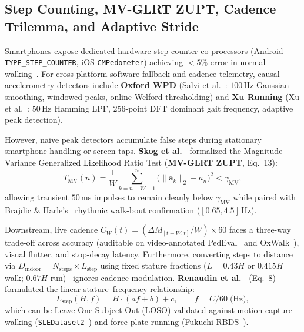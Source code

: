 \subsection{Step Counting, MV-GLRT ZUPT, Cadence Trilemma, and Adaptive Stride}
Smartphones expose dedicated hardware step-counter co-processors (Android \texttt{TYPE\_STEP\_COUNTER}, iOS \texttt{CMPedometer}) achieving $<5\%$ error in normal walking~\cite{brajdic2013walk}. For cross-platform software fallback and cadence telemetry, causal accelerometry detectors include \textbf{Oxford WPD} (Salvi et al.~\cite{salvi2018oxford}: $100$\,Hz Gaussian smoothing, windowed peaks, online Welford thresholding) and \textbf{Xu Running} (Xu et al.~\cite{xu2022step}: $50$\,Hz Hamming LPF, 256-point DFT dominant gait frequency, adaptive peak detection).

However, naive peak detectors accumulate false steps during stationary smartphone handling or screen taps. \textbf{Skog et al.~\cite{skog2010zupt}} formalized the Magnitude-Variance Generalized Likelihood Ratio Test (\textbf{MV-GLRT ZUPT}, Eq.~13):
\begin{equation}
    T_{\text{MV}}(n) = \frac{1}{W}\sum_{k=n-W+1}^{n} \bigl(\|\mathbf{a}_k\|_2 - \bar{a}_n\bigr)^2 < \gamma_{\text{MV}},
    \label{eq:mv_glrt_lit}
\end{equation}
allowing transient $50$\,ms impulses to remain cleanly below $\gamma_{\text{MV}}$ while paired with Brajdic \& Harle's~\cite{brajdic2013walk} rhythmic walk-bout confirmation ($[0.65, 4.5]$\,Hz).

Downstream, live cadence $C_W(t) = (\Delta M_{[t-W,t]}/W)\times 60$ faces a three-way trade-off across accuracy (auditable on video-annotated PedEval~\cite{mattfeld2021pedeval} and OxWalk~\cite{oxwalk2022oxford}), visual flutter, and stop-decay latency. Furthermore, converting steps to distance via $D_{\text{indoor}} = N_{\text{steps}} \times L_{\text{step}}$ using fixed stature fractions ($L = 0.43H$ or $0.415H$ walk; $0.67H$ run)~\cite{taborri2016gait,xing2017stride} ignores cadence modulation. \textbf{Renaudin et al.~\cite{renaudin2012step}} (Eq.~8) formulated the linear stature--frequency relationship:
\begin{equation}
    L_{\text{step}}(H, f) = H \cdot (a f + b) + c, \qquad f = C/60\;\text{(Hz)},
    \label{eq:renaudin_lit}
\end{equation}
which can be Leave-One-Subject-Out (LOSO) validated against motion-capture walking (\texttt{SLEDataset2}~\cite{vezocnik2021sle}) and force-plate running (Fukuchi RBDS~\cite{fukuchi2017public}).

